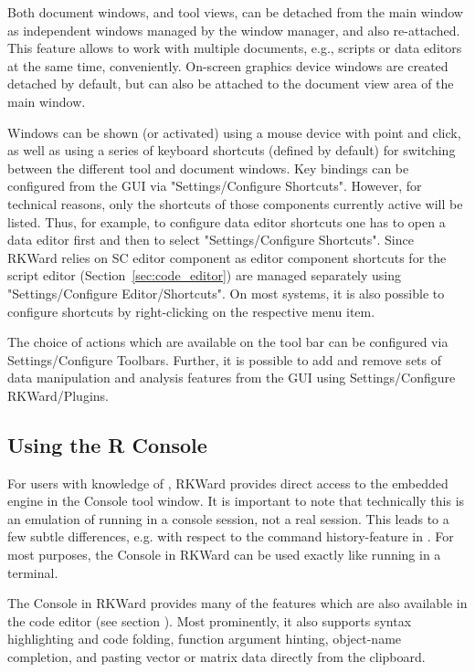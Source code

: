 Both document windows, and tool views, can be detached from the main
window as independent windows managed by the window manager, and also
re-attached. This feature allows to work with multiple documents, e.g.,
scripts or data editors at the same time, conveniently. On{}-screen
graphics device windows are created detached by default, but can also
be attached to the document view area of the main window.

Windows can be shown (or activated) using a mouse device with point and
click, as well as using a series of keyboard shortcuts (defined by
default) for switching between the different tool and document windows.
Key bindings can be configured from the GUI via "Settings/Configure
Shortcuts". However, for technical reasons, only the shortcuts of those
components currently active will be listed. Thus, for example, to
configure data editor shortcuts one has to open a data editor first and
then to select "Settings/Configure Shortcuts". Since RKWard relies on
 SC editor component as editor component
shortcuts for the script editor (Section~\ref{sec:code_editor}) are managed separately using
"Settings/Configure Editor/Shortcuts". On most systems, it is also
possible to configure shortcuts by right-clicking on the respective
menu item.

The choice of actions which are available on the tool bar can be
configured via Settings/Configure Toolbars. Further, it is possible to add and remove sets
of data manipulation and analysis features from the GUI using
Settings/Configure RKWard/Plugins.

\subsection{Using the R Console}
\label{sec:using_R_console}
For users with knowledge of , RKWard provides direct access to the
embedded  engine in the
 Console tool window. It is important to note that technically this is an
emulation of  running in a console
session, not a real  session. This leads to a few subtle
differences, e.g. with respect to the command history-feature in
. For most purposes, the  Console in RKWard can be used exactly
like  running in a terminal.

The  Console in RKWard provides many of the
features which are also available in the code editor (see section ).
Most prominently, it also supports syntax highlighting and code
folding, function argument hinting, object-name completion, and pasting
vector or matrix data directly from the clipboard.

